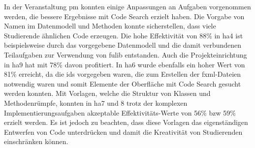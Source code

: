 In der Veranstaltung \ac{pm} konnten einige Anpassungen an Aufgaben vorgenommen werden, die bessere Ergebnisse mit Code Search erzielt haben.
Die Vorgabe von Namen im Datenmodell und Methoden konnte sicherstellen, dass viele Studierende ähnlichen Code erzeugen.
Die hohe Effektivität von 88\% in \ac{ha}4 ist beispielsweise durch das vorgegebene Datenmodell und die damit verbundenen Teilaufgaben zur Verwendung von fulib entstanden.
Auch die Projekteinrichtung in \ac{ha}9 hat mit 78\% davon profitiert.
In \ac{ha}6 wurde ebenfalls ein hoher Wert von 81\% erreicht, da die \acp{id} vorgegeben waren, die zum Erstellen der \ac{fxml}-Dateien notwendig waren und somit Elemente der Oberfläche mit Code Search gesucht werden konnten.
Mit Vorlagen, welche die Struktur von Klassen und Methodenrümpfe, konnten in \ac{ha}7 und 8 trotz der komplexen Implementierungsaufgaben akzeptable Effektivitäts-Werte von 56\% \ac{bzw} 59\% erzielt werden.
Es ist jedoch zu beachten, dass diese Vorlagen das eigenständigen Entwerfen von Code unterdrücken und damit die Kreativität von Studierenden einschränken können.
